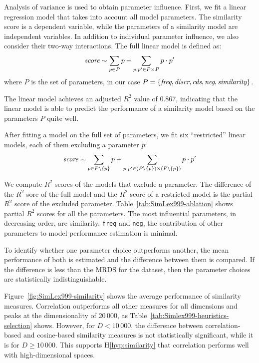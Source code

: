 Analysis of variance is used to obtain parameter influence. First, we fit a linear regression model that takes into account all model parameters. The similarity score is a dependent variable, while the parameters of a similarity model are independent variables. In addition to individual parameter influence, we also consider their two-way interactions. The full linear model is defined as:
\begin{equation}
  \text{\it score} \sim \sum_{p \in P}p + \sum_{p, p' \in P \times P}p \cdot p'
\end{equation}
where $P$ is the set of parameters, in our case $P = \{\text{\it freq}, \text{\it discr}, \text{\it cds}, \text{\it neg}, \text{\it similarity} \}$.

The linear model achieves an adjusted $R^2$ value of 0.867, indicating that the linear model is able to predict the performance of a similarity model based on the parameters $P$ quite well.

After fitting a model on the full set of parameters,  we fit six ``restricted'' linear models, each of them excluding a parameter $\bar p$:
\begin{equation}
  \text{\it score} \sim \sum_{p \in P \setminus \{\bar p\} }p + \sum_{p, p' \in (P \setminus \{\bar p\}) \times (P \setminus \{\bar p\})}p \cdot p'
\end{equation}





We compute $R^2$ scores of the models that exclude a parameter. The difference of the $R^2$ sore of the full model and the $R^2$ score of a restricted model is the partial $R^2$ score of the excluded parameter. Table~\ref{tab:SimLex999-ablation} shows partial $R^2$ scores for all the parameters. The most influential parameters, in decreasing order, are similarity, \texttt{freq} and \texttt{neg}, the contribution of other parameters to model performance estimation is minimal.

To identify whether one parameter choice outperforms another, the mean performance of both is estimated and the difference between them is compared. If the difference is less than the MRDS for the dataset, then the parameter choices are statistically indistinguishable.


Figure~\ref{fig:SimLex999-similarity} shows the average performance of similarity measures. Correlation outperforms all other measures for all dimensions and peaks at the dimensionality of 20\,000, as Table~\ref{tab:Simlex999-heuristics-selection} shows. However, for $D < 10\,000$, the difference between correlation-based and cosine-based similarity measures is not statistically significant, while it is for $D \ge 10\,000$. This supports H\ref{hyp:similarity} that correlation performs well with high-dimensional spaces.

